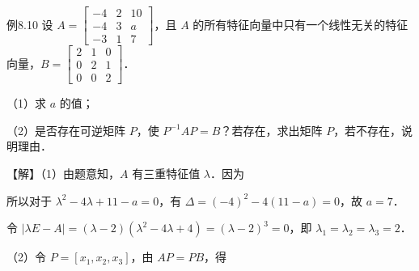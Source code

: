 \begin{fcard}{例8.10}
设 $A=\begin{bmatrix}-4&2&10\\-4&3&a\\-3&1&7\end{bmatrix}$，且 $A$ 的所有特征向量中只有一个线性无关的特征向量，$B=\begin{bmatrix}2&1&0\\0&2&1\\0&0&2\end{bmatrix}$．

（1）求 $a$ 的值；

（2）是否存在可逆矩阵 $P$，使 $P^{-1}AP=B$？若存在，求出矩阵 $P$，若不存在，说明理由．

【解】（1）由题意知，$A$ 有三重特征值 $\lambda$．因为




所以对于 $\lambda^2-4\lambda+11-a=0$，有 $\Delta=(-4)^2-4(11-a)=0$，故 $a=7$．

令 $|\lambda E-A|=(\lambda-2)(\lambda^2-4\lambda+4)=(\lambda-2)^3=0$，即 $\lambda_1=\lambda_2=\lambda_3=2$．

（2）令 $P=[x_1,x_2,x_3]$，由 $AP=PB$，得



\end{fcard}
